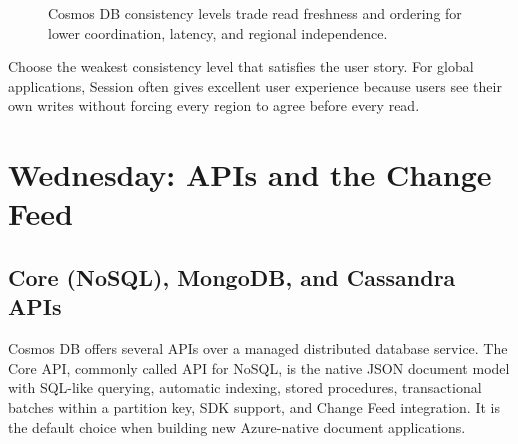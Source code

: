 \begin{figure}[H]
    \centering
    \caption{Cosmos DB consistency levels trade read freshness and ordering for lower coordination, latency, and regional independence.}
    \label{fig:cosmos-consistency-spectrum}
\end{figure}

\begin{tipbox}
Choose the weakest consistency level that satisfies the user story. For global applications, Session often gives excellent user experience because users see their own writes without forcing every region to agree before every read.
\end{tipbox}

\section{Wednesday: APIs and the Change Feed}

\subsection{Core (NoSQL), MongoDB, and Cassandra APIs}
Cosmos DB offers several APIs over a managed distributed database service. The Core API, commonly called API for NoSQL, is the native JSON document model with SQL-like querying, automatic indexing, stored procedures, transactional batches within a partition key, SDK support, and Change Feed integration. It is the default choice when building new Azure-native document applications.

